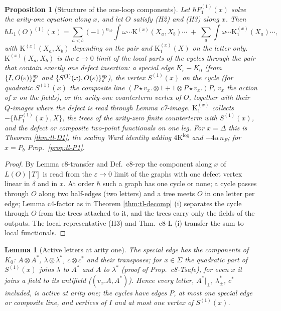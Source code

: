 \documentclass[11pt]{article}
\numberwithin{equation}{section}
\theoremstyle{plain}
\newtheorem{proposition}[theorem]{Proposition}
\newtheorem{lemma}[theorem]{Lemma}
\theoremstyle{definition}
\begin{document}
\begin{proposition}[Structure of the one-loop components]
\label{prop:tl-arity1}
Let $\hbar F_1^{(1)}(x)$ solve the arity-one equation along $x$, and let $O$ satisfy (H2) and (H3) along $x$. Then
\[
\hbar L_1(O)^{(1)}(x)=\sum_{a<b}(-1)^{n_{ab}}\int\omega\cdots\mathrm K^{(x)}(X_a,X_b)\cdots\;+\;\sum_a\int\omega\cdots\mathrm K^{(x)}_1(X_a)\cdots,
\]
with $\mathrm K^{(x)}(X_a,X_b)$ depending on the pair and $\mathrm K^{(x)}_1(X)$ on the letter only. $\mathrm K^{(x)}(X_a,X_b)$ is the $\varepsilon\to0$ limit of the local parts of the cycles through the pair that contain exactly one defect insertion: a special edge $K_\varepsilon-K_0$ (from $\{I,O(\varepsilon)\}^{\rm sp}_\varepsilon$ and $\{S^{(1)}(x),O(\varepsilon)\}^{\rm sp}_\varepsilon$), the vertex $S^{(1)}(x)$ on the cycle (for quadratic $S^{(1)}(x)$ the composite line $(P\star v_x.\otimes1+1\otimes P\star v_x.)P$, $v_x$ the action of $x$ on the fields), or the arity-one counterterm vertex of $O$, together with their $Q$-images where the defect is read through Lemma c7-image. $\mathrm K^{(x)}_1$ collects $-\{\hbar F_1^{(1)}(x),X\}$, the trees of the arity-zero finite counterterm with $S^{(1)}(x)$, and the defect or composite two-point functionals on one leg. For $x=\Delta$ this is Theorem \ref{thm:tl-D1}, the scaling Ward identity adding $4\mathrm K^{\log}$ and $-4u\,n_F$; for $x=P_b$ Prop.~\ref{prop:tl-P1}.
\end{proposition}

\begin{proof}
By Lemma c8-transfer and Def.~c8-rep the component along $x$ of $L(O)[T]$ is read from the $\varepsilon\to0$ limit of the graphs with one defect vertex linear in $\delta$ and in $x$. At order $\hbar$ such a graph has one cycle or none; a cycle passes through $O$ along two half-edges (two letters) and a tree meets $O$ in one letter per edge; Lemma c4-factor as in Theorem \ref{thm:tl-decomp} (i) separates the cycle through $O$ from the trees attached to it, and the trees carry only the fields of the outputs. The local representative (H3) and Thm.~c8-L (i) transfer the sum to local functionals.
\end{proof}

\begin{lemma}[Active letters at arity one]
\label{lem:tl-active1}
The special edge has the components of $K_0$: $A\otimes A^*$, $\lambda\otimes\lambda^*$, $c\otimes c^*$ and their transposes; for $x\in\Sigma$ the quadratic part of $S^{(1)}(x)$ joins $\lambda$ to $A^*$ and $A$ to $\lambda^*$ (proof of Prop.~c8-Tsafe), for even $x$ it joins a field to its antifield ($(v_x.A,A^*)$). Hence every letter, $A^*|_\perp$, $\lambda^*_\pm$, $c^*$ included, is active at arity one; the cycles have edges $P$, at most one special edge or composite line, and vertices of $I$ and at most one vertex of $S^{(1)}(x)$.
\end{lemma}
\end{document}
